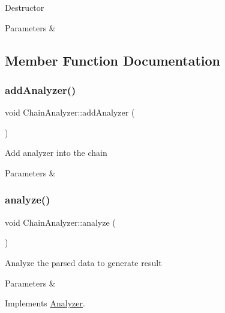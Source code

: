 Destructor


\begin{DoxyParams}{Parameters}
{\em } & \\
\hline
\end{DoxyParams}


\subsection{Member Function Documentation}
\mbox{\label{class_chain_analyzer_a48f4f1f65d4eb2bd551ec6895b41ff51}} 
\subsubsection{\texorpdfstring{add\+Analyzer()}{addAnalyzer()}}
{\footnotesize\ttfamily void Chain\+Analyzer\+::add\+Analyzer (\begin{DoxyParamCaption}{ }\end{DoxyParamCaption})}

Add analyzer into the chain


\begin{DoxyParams}{Parameters}
{\em } & \\
\hline
\end{DoxyParams}
\mbox{\label{class_chain_analyzer_a01d1323c8b1ef850d299c5625c2c97f2}} 
\subsubsection{\texorpdfstring{analyze()}{analyze()}}
{\footnotesize\ttfamily void Chain\+Analyzer\+::analyze (\begin{DoxyParamCaption}{ }\end{DoxyParamCaption})\hspace{0.3cm}{\ttfamily [virtual]}}

Analyze the parsed data to generate result


\begin{DoxyParams}{Parameters}
{\em } & \\
\hline
\end{DoxyParams}


Implements \mbox{\hyperlink{class_analyzer}{Analyzer}}.

